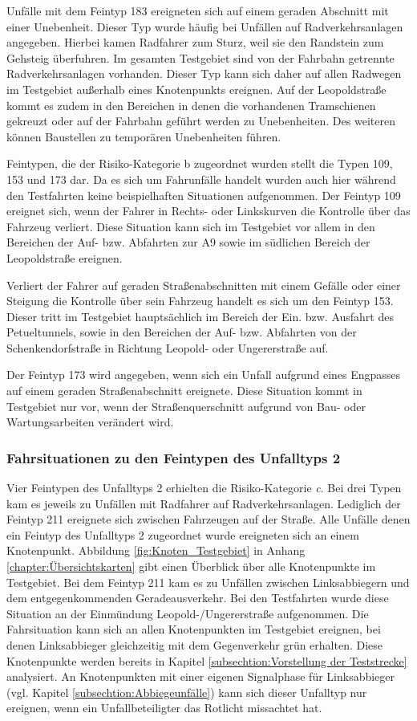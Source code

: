 Unfälle mit dem Feintyp 183 ereigneten sich auf einem geraden Abschnitt mit einer Unebenheit. Dieser Typ wurde häufig bei Unfällen auf Radverkehrsanlagen angegeben. Hierbei kamen Radfahrer zum Sturz, weil sie den Randstein zum Gehsteig überfuhren. Im gesamten Testgebiet sind von der Fahrbahn getrennte Radverkehrsanlagen vorhanden. Dieser Typ kann sich daher auf allen Radwegen im Testgebiet außerhalb eines Knotenpunkts ereignen. Auf der Leopoldstraße kommt es zudem in den Bereichen in denen die vorhandenen Tramschienen gekreuzt oder auf der Fahrbahn geführt werden zu Unebenheiten. Des weiteren können Baustellen zu temporären Unebenheiten führen.

Feintypen, die der Risiko-Kategorie b zugeordnet wurden stellt die Typen 109, 153 und 173 dar. Da es sich um Fahrunfälle handelt wurden auch hier während den Testfahrten keine beispielhaften Situationen aufgenommen. Der Feintyp 109 ereignet sich, wenn der Fahrer in Rechts- oder Linkskurven die Kontrolle über das Fahrzeug verliert. Diese Situation kann sich im Testgebiet vor allem in den Bereichen der Auf- bzw. Abfahrten zur A9 sowie im südlichen Bereich der Leopoldstraße ereignen.

Verliert der Fahrer auf geraden Straßenabschnitten mit einem Gefälle oder einer Steigung die Kontrolle über sein Fahrzeug handelt es sich um den Feintyp 153. Dieser tritt im Testgebiet hauptsächlich im Bereich der Ein. bzw. Ausfahrt des Petueltunnels, sowie in den Bereichen der Auf- bzw. Abfahrten von der Schenkendorfstraße in Richtung Leopold- oder Ungererstraße auf.

Der Feintyp 173 wird angegeben, wenn sich ein Unfall aufgrund eines Engpasses auf einem geraden Straßenabschnitt ereignete. Diese Situation kommt in Testgebiet nur vor, wenn der Straßenquerschnitt aufgrund von Bau- oder Wartungsarbeiten verändert wird.

\subsubsection{Fahrsituationen zu den Feintypen des Unfalltyps 2}
Vier Feintypen des Unfalltyps 2 erhielten die Risiko-Kategorie \textit{c}. Bei drei Typen kam es jeweils zu Unfällen mit Radfahrer auf Radverkehrsanlagen. Lediglich der Feintyp 211 ereignete sich zwischen Fahrzeugen auf der Straße. Alle Unfälle denen ein Feintyp des Unfalltyps 2 zugeordnet wurde ereigneten sich an einem Knotenpunkt. Abbildung \ref{fig:Knoten_Testgebiet} in Anhang \ref{chapter:Übersichtskarten} gibt einen Überblick über alle Knotenpunkte im Testgebiet. Bei dem Feintyp 211  kam es zu Unfällen zwischen Linksabbiegern und dem entgegenkommenden Geradeausverkehr. Bei den Testfahrten wurde diese Situation an der Einmündung Leopold-/Ungererstraße aufgenommen. Die Fahrsituation kann sich an allen Knotenpunkten im Testgebiet ereignen, bei denen Linksabbieger gleichzeitig mit dem Gegenverkehr grün erhalten. Diese Knotenpunkte werden bereits in Kapitel \ref{subsechtion:Vorstellung der Teststrecke} analysiert. An Knotenpunkten mit einer eigenen Signalphase für Linksabbieger (vgl. Kapitel \ref{subsechtion:Abbiegeunfälle}) kann sich dieser Unfalltyp nur ereignen, wenn ein Unfallbeteiligter das Rotlicht missachtet hat.

